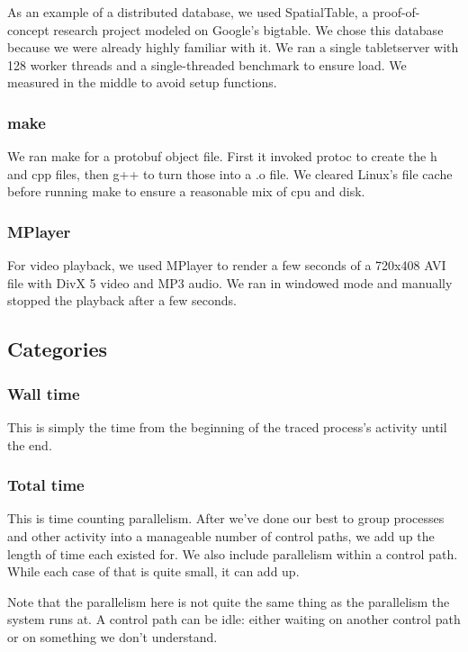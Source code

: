 \documentclass[10pt]{article}
\begin{document}
As an example of a distributed database, we used SpatialTable\cite{spatialtable}, a proof-of-concept research project modeled on Google's bigtable\cite{bigtable}.  We chose this database because we were already highly familiar with it.  We ran a single tabletserver with 128 worker threads and a single-threaded benchmark to ensure load.  We measured in the middle to avoid setup functions.

\subsubsection{make}

We ran make for a protobuf object file.\cite{pb}  First it invoked protoc to create the h and cpp files, then g++ to turn those into a .o file.  We cleared Linux's file cache before running make to ensure a reasonable mix of cpu and disk.

\subsubsection{MPlayer}

For video playback, we used MPlayer to render a few seconds of a 720x408 AVI file with DivX 5 video and MP3 audio.  We ran in windowed mode and manually stopped the playback after a few seconds.

\subsection{Categories}

\subsubsection{Wall time}

This is simply the time from the beginning of the traced process's activity until the end.

\subsubsection{Total time}

This is time counting parallelism.  After we've done our best to group processes and other activity into a manageable number of control paths, we add up the length of time each existed for.  We also include parallelism within a control path.  While each case of that is quite small, it can add up.

Note that the parallelism here is not quite the same thing as the parallelism the system runs at.  A control path can be idle: either waiting on another control path or on something we don't understand.
\end{document}
